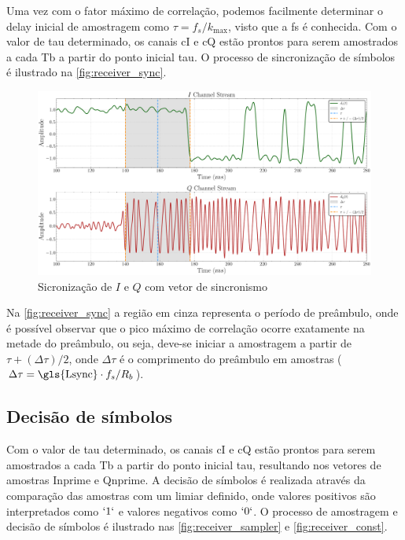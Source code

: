 Uma vez com o fator máximo de correlação, podemos facilmente determinar o delay inicial de amostragem como $\tau = f_s / k_{\text{max}}$, visto que a \gls{fs} é conhecida. Com o valor de \gls{tau} determinado, os canais \gls{cI} e \gls{cQ} estão prontos para serem amostrados a cada \gls{Tb} a partir do ponto inicial \gls{tau}. O processo de sincronização de símbolos é ilustrado na \autoref{fig:receiver_sync}.

\begin{figure}[H]
	\centering
	\caption{Sicronização de $I$ e $Q$ com vetor de sincronismo}\label{fig:receiver_sync}
	\includegraphics[width=\linewidth]{assets/cap3/receiver_sync_time.pdf}
\end{figure}

Na \autoref{fig:receiver_sync} a região em cinza representa o período de preâmbulo, onde é possível observar que o pico máximo de correlação ocorre exatamente na metade do preâmbulo, ou seja, deve-se iniciar a amostragem a partir de $\tau + (\Delta \tau)/2$, onde $\Delta \tau$ é o comprimento do preâmbulo em amostras ($\Delta \tau = \text{\gls{Lsync}} \cdot f_s/R_b$). 

\subsection{Decisão de símbolos}\label{sec:decisao_simbolos}

Com o valor de \gls{tau} determinado, os canais \gls{cI} e \gls{cQ} estão prontos para serem amostrados a cada \gls{Tb} a partir do ponto inicial \gls{tau}, resultando nos vetores de amostras \gls{Inprime} e \gls{Qnprime}. A decisão de símbolos é realizada através da comparação das amostras com um limiar definido, onde valores positivos são interpretados como $`1`$ e valores negativos como $`0`$. O processo de amostragem e decisão de símbolos é ilustrado nas \autoref{fig:receiver_sampler} e \autoref{fig:receiver_const}.

